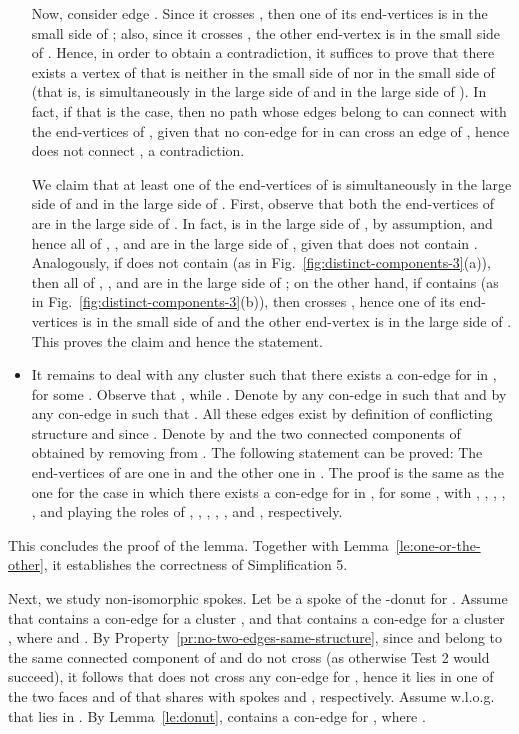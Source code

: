 \documentclass[letter,runningheads]{llncs}
\renewenvironment{proof}
{{\em Proof.\ }}{\hspace*{\fill}\par\vspace{2mm}}
\begin{document}
\begin{proof}
\begin{itemize}
Now, consider edge . Since it crosses , then one of its end-vertices is in the small side of ; also, since it crosses , the other end-vertex is in the small side of . Hence, in order to obtain a contradiction, it suffices to prove that there exists a vertex  of  that is neither in the small side of   nor in the small side of  (that is,  is simultaneously in the large side of   and in the large side of  ). In fact, if that is the case, then no path whose edges belong to  can connect  with the end-vertices of , given that no con-edge for  in  can cross an edge of , hence  does not connect , a contradiction.

We claim that at least one of the end-vertices of  is simultaneously in the large side of   and in the large side of  . First, observe that both the end-vertices of  are in the large side of . In fact,  is in the large side of , by assumption, and hence all of , , and  are in the large side of , given that  does not contain . Analogously, if  does not contain  (as in Fig.~\ref{fig:distinct-components-3}(a)), then all of , , and  are in the large side of ; on the other hand, if  contains  (as in Fig.~\ref{fig:distinct-components-3}(b)), then  crosses , hence one of its end-vertices is in the small side of  and the other end-vertex is in the large side of . This proves the claim and hence the statement.


\item It remains to deal with any cluster  such that there exists a con-edge  for  in , for some . Observe that , while . Denote by  any con-edge in  such that  and by  any con-edge in  such that . All these edges exist by definition of conflicting structure and since . Denote by  and  the two connected components of  obtained by removing  from . The following statement can be proved: The end-vertices of  are one in  and the other one in . The proof is the same as the one for the case in which there exists a con-edge  for  in , for some , with , , , , , and  playing the roles of , , , , , and , respectively.
\end{itemize}

This concludes the proof of the lemma. Together with Lemma~\ref{le:one-or-the-other}, it establishes the correctness of {\sc Simplification 5}.
\end{proof}


Next, we study non-isomorphic spokes. Let  be a spoke of the -donut for . Assume that  contains a con-edge  for a cluster , and that  contains a con-edge  for a cluster , where  and . By Property~\ref{pr:no-two-edges-same-structure}, since  and  belong to the same connected component of  and do not cross (as otherwise {\sc Test 2} would succeed), it follows that  does not cross any con-edge for , hence it lies in one of the two faces  and  of  that  shares with spokes  and , respectively. Assume w.l.o.g. that  lies in . By Lemma~\ref{le:donut},  contains a con-edge  for , where .
\end{document}

